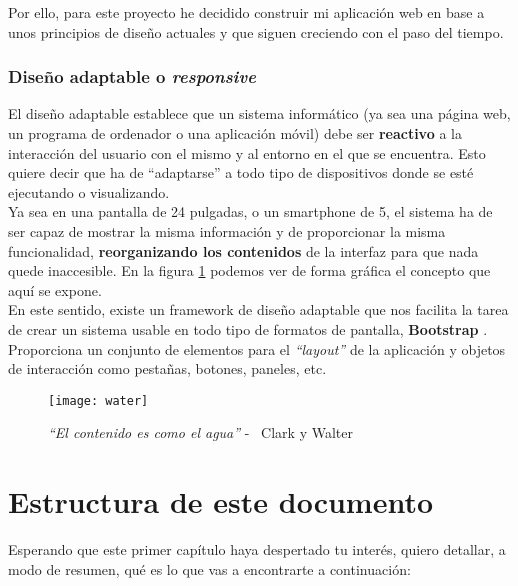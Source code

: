 Por ello, para este proyecto he decidido construir mi aplicación web en base a unos principios de diseño actuales y que siguen creciendo con el paso del tiempo.

\subsubsection{Diseño adaptable o \textit{responsive}}
El diseño adaptable establece que un sistema informático (ya sea una página web, un programa de ordenador o una aplicación móvil) debe ser \textbf{reactivo} a la interacción del usuario con el mismo y al entorno en el que se encuentra. Esto quiere decir que ha de ``adaptarse'' a todo tipo de dispositivos donde se esté ejecutando o visualizando.\\

Ya sea en una pantalla de 24 pulgadas, o un smartphone de 5, el sistema ha de ser capaz de mostrar la misma información y de proporcionar la misma funcionalidad, \textbf{reorganizando los contenidos} de la interfaz para que nada quede inaccesible. En la figura \ref{water} podemos ver de forma gráfica el concepto que aquí se expone.\\

En este sentido, existe un framework de diseño adaptable que nos facilita la tarea de crear un sistema usable en todo tipo de formatos de pantalla, \textbf{Bootstrap} \cite{bootstrap}. Proporciona un conjunto de elementos para el \textit{``layout''} de la aplicación y objetos de interacción como pestañas, botones, paneles, etc.

\begin{figure}
    \centering
    \texttt{[image: water]}
    \caption{\textit{``El contenido es como el agua''} - \textcopyright\ Clark y Walter \cite{contentwater}}
    \label{water}
\end{figure}

\section{Estructura de este documento}
Esperando que este primer capítulo haya despertado tu interés, quiero detallar, a modo de resumen, qué es lo que vas a encontrarte a continuación:

